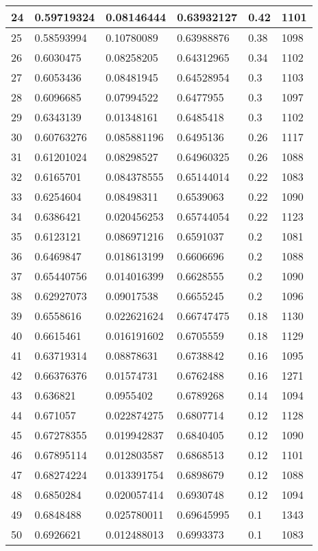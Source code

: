 \begin{longtable}{|l|l|l|l|l|l|}
24 & 0.59719324 & 0.08146444 & 0.63932127 & 0.42 & 1101 \\ \hline 
25 & 0.58593994 & 0.10780089 & 0.63988876 & 0.38 & 1098 \\ \hline 
26 & 0.6030475 & 0.08258205 & 0.64312965 & 0.34 & 1102 \\ \hline 
27 & 0.6053436 & 0.08481945 & 0.64528954 & 0.3 & 1103 \\ \hline 
28 & 0.6096685 & 0.07994522 & 0.6477955 & 0.3 & 1097 \\ \hline 
29 & 0.6343139 & 0.01348161 & 0.6485418 & 0.3 & 1102 \\ \hline 
30 & 0.60763276 & 0.085881196 & 0.6495136 & 0.26 & 1117 \\ \hline 
31 & 0.61201024 & 0.08298527 & 0.64960325 & 0.26 & 1088 \\ \hline 
32 & 0.6165701 & 0.084378555 & 0.65144014 & 0.22 & 1083 \\ \hline 
33 & 0.6254604 & 0.08498311 & 0.6539063 & 0.22 & 1090 \\ \hline 
34 & 0.6386421 & 0.020456253 & 0.65744054 & 0.22 & 1123 \\ \hline 
35 & 0.6123121 & 0.086971216 & 0.6591037 & 0.2 & 1081 \\ \hline 
36 & 0.6469847 & 0.018613199 & 0.6606696 & 0.2 & 1088 \\ \hline 
37 & 0.65440756 & 0.014016399 & 0.6628555 & 0.2 & 1090 \\ \hline 
38 & 0.62927073 & 0.09017538 & 0.6655245 & 0.2 & 1096 \\ \hline 
39 & 0.6558616 & 0.022621624 & 0.66747475 & 0.18 & 1130 \\ \hline 
40 & 0.6615461 & 0.016191602 & 0.6705559 & 0.18 & 1129 \\ \hline 
41 & 0.63719314 & 0.08878631 & 0.6738842 & 0.16 & 1095 \\ \hline 
42 & 0.66376376 & 0.01574731 & 0.6762488 & 0.16 & 1271 \\ \hline 
43 & 0.636821 & 0.0955402 & 0.6789268 & 0.14 & 1094 \\ \hline 
44 & 0.671057 & 0.022874275 & 0.6807714 & 0.12 & 1128 \\ \hline 
45 & 0.67278355 & 0.019942837 & 0.6840405 & 0.12 & 1090 \\ \hline 
46 & 0.67895114 & 0.012803587 & 0.6868513 & 0.12 & 1101 \\ \hline 
47 & 0.68274224 & 0.013391754 & 0.6898679 & 0.12 & 1088 \\ \hline 
48 & 0.6850284 & 0.020057414 & 0.6930748 & 0.12 & 1094 \\ \hline 
49 & 0.6848488 & 0.025780011 & 0.69645995 & 0.1 & 1343 \\ \hline 
50 & 0.6926621 & 0.012488013 & 0.6993373 & 0.1 & 1083 \\ \hline 
\end{longtable}